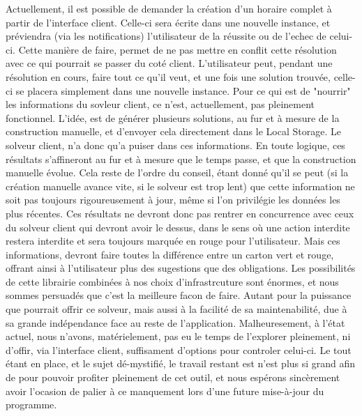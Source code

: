 \indent

Actuellement, il est possible de demander la création d'un horaire complet à partir de l'interface client. Celle-ci sera écrite dans une nouvelle instance, et préviendra (via les notifications) l'utilisateur de la réussite ou de l'echec de celui-ci.  Cette manière de faire, permet de ne pas mettre en conflit cette résolution avec ce qui pourrait se passer du coté client. L'utilisateur peut, pendant une résolution en cours, faire tout ce qu'il veut, et une fois une solution trouvée, celle-ci se placera simplement dans une nouvelle instance.
Pour ce qui est de "nourrir" les informations du sovleur client, ce n'est, actuellement, pas pleinement fonctionnel. L'idée, est de générer plusieurs solutions, 
au fur et à mesure de la construction manuelle, et d'envoyer cela directement dans le Local Storage. Le solveur client, n'a donc qu'a puiser dans ces informations.
En toute logique, ces résultats s'affineront au fur et à mesure que le temps passe, et que la construction manuelle évolue. Cela reste de l'ordre du conseil, étant donné qu'il se peut (si la création manuelle avance vite, si le solveur est trop lent) que cette information ne soit pas toujours rigoureusement à jour, même si l'on privilégie les données les plus récentes.  Ces résultats ne devront donc pas rentrer en concurrence avec ceux du solveur client qui devront avoir le dessus, dans le sens où une action interdite restera interdite et sera toujours marquée en rouge pour l'utilisateur. 
Mais ces informations, devront faire toutes la différence entre un carton vert et rouge, offrant ainsi à l'utilisateur plus des sugestions que des obligations. 
\newline
\indent
Les possibilités de cette librairie combinées à nos choix d'infrastrcuture sont énormes, et nous sommes persuadés que c'est la meilleure facon de faire. Autant pour la puissance que pourrait offrir ce solveur, mais aussi à la facilité de sa maintenabilité, due à sa grande indépendance face au reste de l'application.
Malheuresement, à l'état actuel, nous n'avons, matérielement, pas eu le temps de l'explorer pleinement, ni d'offir, via l'interface client, suffisament d'options pour controler celui-ci.
Le tout étant en place, et le sujet dé-mystifié, le travail restant est n'est plus si grand afin de pour pouvoir profiter pleinement de cet outil, et nous espérons sincèrement avoir l'ocasion de palier à ce manquement lors d'une future mise-à-jour du programme.
